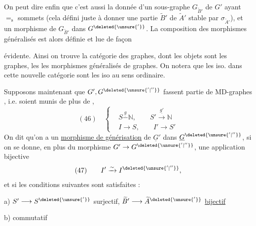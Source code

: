 On peut dire enfin que c'est aussi la donnée d'un sous-graphe $G_{\widetilde B'}$ de $G'$ ayant $=_{\mathrm s}$ sommets (cela défini juste  à donner une partie $\widetilde B'$ de $\widetilde A'$ stable par $\sigma_{\widetilde A'}$), et un morphisme de $G_{\widetilde B'}$ dans $G^{\deleted{\unsure{'}}}$. La composition des morphismes généralisés est alors définie et lue de façon

évidente. Ainsi on trouve la catégorie  des graphes, dont les objets sont les graphes, les  les morphismes généralisés de graphes. On notera que les iso. dans cette nouvelle catégorie sont les iso au sens ordinaire.

Supposons maintenant que $G',G^{\deleted{\unsure{'|''}}}$ fassent partie de MD-graphes , i.e. soient munis de plus de ,
\[
(46)\quad\left\{\begin{aligned}
&S\overset{\underline g}{-}\mathbb N,\qquad S'\xrightarrow{\underline{g'}}\mathbb N\\
&I\longrightarrow S,\qquad I'\longrightarrow S'
\end{aligned}\right.
\]
On dit qu'on a un \uline{morphisme de générisation} de $\underline G'$ dans $\underline G^{\deleted{\unsure{'|''}}}$, si on se donne, en plus du morphisme  $G'\to G^{\deleted{\unsure{'|''}}}$, une application bijective
\[
(47)\qquad I'\xrightarrow{\sim}I^{\deleted{\unsure{'|''}}},
\]
 et si les conditions suivantes sont satisfaites :

a) $S'\longrightarrow S^{\deleted{\unsure{'}}}$ surjectif, $\widetilde B'\longrightarrow\widetilde A^{\deleted{\unsure{'}}}$ \uline{bijectif}

b)  commutatif


